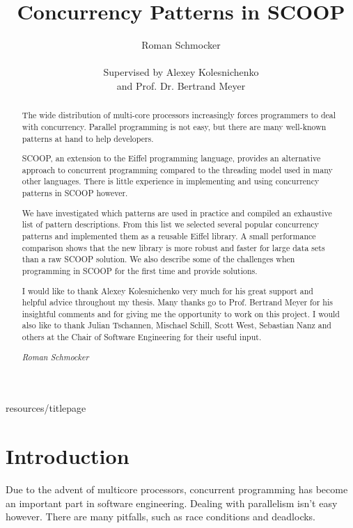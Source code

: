 \documentclass[a4paper,10pt,titlepage]{article}
\title{Concurrency Patterns in SCOOP}
\author{Roman Schmocker \\ \\ Supervised by Alexey Kolesnichenko \\ and Prof. Dr. Bertrand Meyer}
\begin{document}
 {resources/titlepage}

\begin{abstract}
\thispagestyle{plain}
\setcounter{page}{2}
The wide distribution of multi-core processors increasingly forces programmers to deal with concurrency.
Parallel programming is not easy, but there are many well-known patterns at hand to help developers.

SCOOP, an extension to the Eiffel programming language, provides an alternative approach to concurrent programming compared to the threading mo\-del used in many other languages.
There is little experience in implementing and using concurrency patterns in SCOOP however.

We have investigated which patterns are used in practice and compiled an exhaustive list of pattern descriptions.
From this list we selected several popular concurrency patterns and implemented them as a reusable Eiffel library.
A small performance comparison shows that the new library is more robust and faster for large data sets than a raw SCOOP solution.
We also describe some of the challenges when programming in SCOOP for the first time and provide solutions.
\end{abstract}

\renewcommand{\abstractname}{Acknowledgements}
\begin{abstract}
\thispagestyle{plain}
\setcounter{page}{3}
I would like to thank Alexey Kolesnichenko very much for his great support and helpful advice throughout my thesis.
Many thanks go to Prof. Bertrand Meyer for his insightful comments and for giving me the opportunity to work on this project.
I would also like to thank Julian Tschannen, Mischael Schill, Scott West, Sebastian Nanz and others at the Chair of Software Engineering for their useful input.

\emph{Roman Schmocker}
\end{abstract}


\setcounter{page}{4}
\tableofcontents

\newpage
{}

\section{Introduction}
\label{sec:introduction}


Due to the advent of multicore processors, concurrent programming has become an important part in software engineering.
Dealing with parallelism isn't easy however.
There are many pitfalls, such as race conditions and deadlocks.
\end{document}
